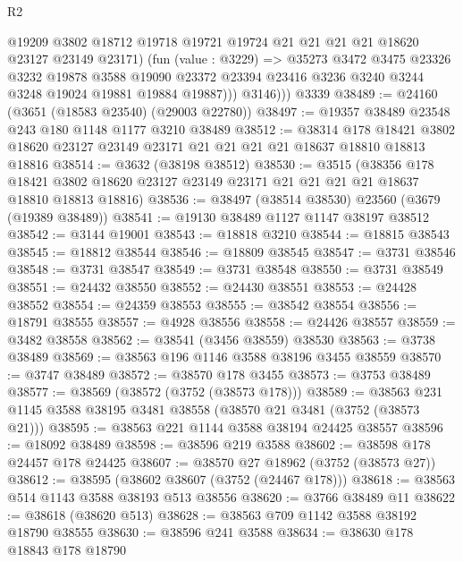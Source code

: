 \begin{lexlean}{R2}
\begin{coremodule}
              @19209
              @3802
              @18712
              @19718
              @19721
              @19724
              @21
              @21
              @21
              @21
              @18620
              @23127
              @23149
              @23171)
            (fun (value : @3229) =>
            @35273
              @3472
              @3475
              @23326
              @3232
              @19878
              @3588
              @19090
              @23372
              @23394
              @23416
              @3236
              @3240
              @3244
              @3248
              @19024
              @19881
              @19884
              @19887)))
          @3146)))
    @3339
@38489 := @24160 (@3651 (@18583 @23540) (@29003 @22780))
@38497 := @19357 @38489 @23548 @243 @180 @1148 @1177 @3210 @38489
@38512 := @38314
    @178
    @18421
    @3802
    @18620
    @23127
    @23149
    @23171
    @21
    @21
    @21
    @21
    @18637
    @18810
    @18813
    @18816
@38514 := @3632 (@38198 @38512)
@38530 := @3515
    (@38356
      @178
      @18421
      @3802
      @18620
      @23127
      @23149
      @23171
      @21
      @21
      @21
      @21
      @18637
      @18810
      @18813
      @18816)
@38536 := @38497 (@38514 @38530) @23560 (@3679 (@19389 @38489))
@38541 := @19130 @38489 @1127 @1147 @38197 @38512
@38542 := @3144 @19001
@38543 := @18818 @3210
@38544 := @18815 @38543
@38545 := @18812 @38544
@38546 := @18809 @38545
@38547 := @3731 @38546
@38548 := @3731 @38547
@38549 := @3731 @38548
@38550 := @3731 @38549
@38551 := @24432 @38550
@38552 := @24430 @38551
@38553 := @24428 @38552
@38554 := @24359 @38553
@38555 := @38542 @38554
@38556 := @18791 @38555
@38557 := @4928 @38556
@38558 := @24426 @38557
@38559 := @3482 @38558
@38562 := @38541 (@3456 @38559) @38530
@38563 := @3738 @38489
@38569 := @38563 @196 @1146 @3588 @38196 @3455 @38559
@38570 := @3747 @38489
@38572 := @38570 @178 @3455
@38573 := @3753 @38489
@38577 := @38569 (@38572 (@3752 (@38573 @178)))
@38589 := @38563 @231 @1145 @3588 @38195 @3481 @38558 (@38570 @21 @3481 (@3752 (@38573 @21)))
@38595 := @38563 @221 @1144 @3588 @38194 @24425 @38557
@38596 := @18092 @38489
@38598 := @38596 @219 @3588
@38602 := @38598 @178 @24457 @178 @24425
@38607 := @38570 @27 @18962 (@3752 (@38573 @27))
@38612 := @38595 (@38602 @38607 (@3752 (@24467 @178)))
@38618 := @38563 @514 @1143 @3588 @38193 @513 @38556
@38620 := @3766 @38489 @11
@38622 := @38618 (@38620 @513)
@38628 := @38563 @709 @1142 @3588 @38192 @18790 @38555
@38630 := @38596 @241 @3588
@38634 := @38630 @178 @18843 @178 @18790

\end{coremodule}
\end{lexlean}
